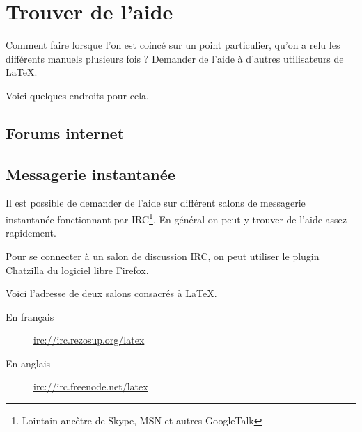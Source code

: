 \chapter{Trouver de l'aide}

\begin{prealable}
Comment faire lorsque l'on est coincé sur un point particulier, qu'on a relu les différents manuels plusieurs fois ? Demander de l'aide à d'autres utilisateurs de \LaTeX.

Voici quelques endroits pour cela.
\end{prealable}

\section{Forums internet}

\section{Messagerie instantanée}

Il est possible de demander de l'aide sur différent salons de messagerie instantanée fonctionnant par IRC\footnote{Lointain ancêtre de Skype, MSN et autres GoogleTalk}. En général on peut y trouver de l'aide assez rapidement.

Pour se connecter à un salon de discussion IRC, on peut utiliser le plugin Chatzilla du logiciel libre Firefox.

Voici l'adresse de deux salons consacrés à \LaTeX.

\begin{description}
\item[En français]\url{irc://irc.rezosup.org/latex}
\item[En anglais]\url{irc://irc.freenode.net/latex}
\end{description}
